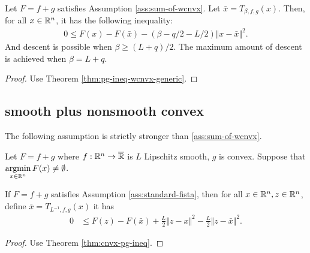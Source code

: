 \documentclass[12pt]{report}
\begin{document}
            \begin{lemma}\;\label{lemma:mono-wcnvx-descent}\\
                Let $F = f + g$ satisfies Assumption \ref{ass:sum-of-wcnvx}. 
                Let $\bar x = T_{\beta, f, g}(x)$. 
                Then, for all $x \in \mathbb R^n$, it has the following inequality: 
                $$
                \begin{aligned}
                    0 \le F(x) - F(\bar x) - (\beta - q/2 - L/2)\Vert x - \bar x\Vert^2. 
                \end{aligned}
                $$
                And descent is possible when $\beta \ge (L + q)/2$. 
                The maximum amount of descent is achieved when $\beta = L + q$. 
            \end{lemma}
            \begin{proof}
                Use Theorem \ref{thm:pg-ineq-wcnvx-generic}. 
            \end{proof}
        \subsection{smooth plus nonsmooth convex}
            The following assumption is strictly stronger than \ref{ass:sum-of-wcnvx}. 
            \begin{assumption}\label{ass:standard-fista}
                Let $F = f + g$ where $f:\mathbb R^n\rightarrow \overline {\mathbb R}$ is $L$ Lipschitz smooth, $g$ is convex. 
                Suppose that $\mathop{\rm argmin}\limits_{x \in \mathbb R^n} F(x)\neq \emptyset$. 
            \end{assumption}
            \begin{lemma}
                If $F = f + g$ satisfies Assumption \ref{ass:standard-fista}, then for all $x \in \mathbb R^n, z \in \mathbb R^n$, define $\bar x = T_{L^{-1}, f, g}(x)$ it has 
                \begin{align*}
                    0 &\le F(z) - F(\bar x) + \frac{L}{2}\Vert z - x\Vert^2 - \frac{L}{2}\Vert z - \bar x\Vert^2. 
                \end{align*}
            \end{lemma}
            \begin{proof}
                Use Theorem \ref{thm:cnvx-pg-ineq}. 
            \end{proof}
            
\end{document}
